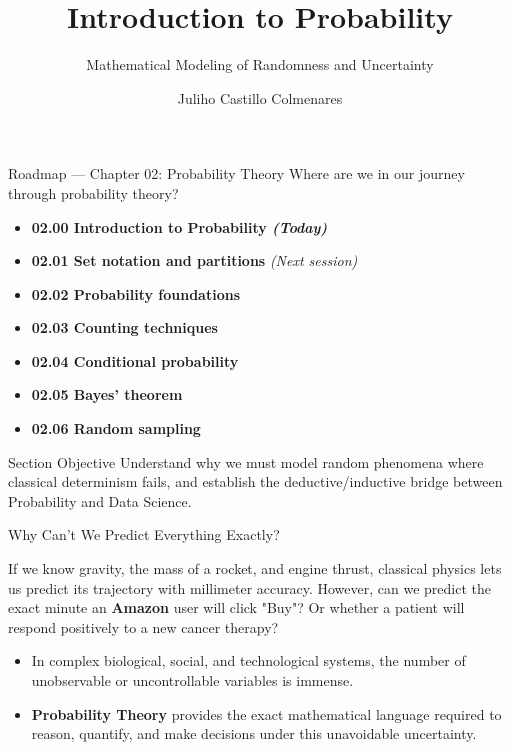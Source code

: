 \documentclass[10pt,aspectratio=169]{beamer}
\title[Probability Introduction]{Introduction to Probability}
\subtitle{Mathematical Modeling of Randomness and Uncertainty}
\author[J. Castillo Colmenares]{Juliho Castillo Colmenares}
\institute{Tecnológico de Monterrey}
\date{}
\begin{document}
\begin{frame}[plain]
  \titlepage
\end{frame}

\begin{frame}{Roadmap — Chapter 02: Probability Theory}
  Where are we in our journey through probability theory? \pause
  \begin{itemize}
    \item \color{TecRojo}\textbf{02.00 Introduction to Probability \emph{(Today)}}\color{black} \pause
    \item \textbf{02.01 Set notation and partitions} \emph{(Next session)} \pause
    \item \textbf{02.02 Probability foundations} \pause
    \item \textbf{02.03 Counting techniques} \pause
    \item \textbf{02.04 Conditional probability} \pause
    \item \textbf{02.05 Bayes' theorem} \pause
    \item \textbf{02.06 Random sampling}
  \end{itemize}
  \vspace{0.8em}
  \begin{block}{Section Objective}
    Understand why we must model random phenomena where classical determinism fails, and establish the deductive/inductive bridge between Probability and Data Science.
  \end{block}
\end{frame}

\begin{frame}{Why Can't We Predict Everything Exactly?}
  \begin{motivacion}
    If we know gravity, the mass of a rocket, and engine thrust, classical physics lets us predict its trajectory with millimeter accuracy. However, can we predict the exact minute an \textbf{Amazon} user will click "Buy"? Or whether a patient will respond positively to a new cancer therapy?
  \end{motivacion}
  
  \vspace{0.6em}
  \pause
  \begin{itemize}
    \item In complex biological, social, and technological systems, the number of unobservable or uncontrollable variables is immense. \pause
    \item \textbf{Probability Theory} provides the exact mathematical language required to reason, quantify, and make decisions under this unavoidable uncertainty.
  \end{itemize}
\end{frame}
\end{document}

